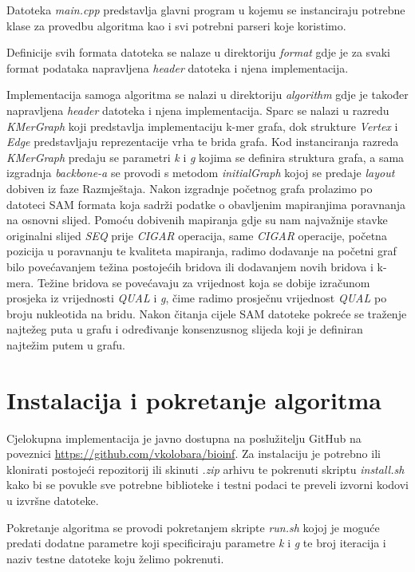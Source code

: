 \documentclass[times, utf8, seminar, numeric]{fer}
\begin{document}
Datoteka \emph{main.cpp} predstavlja glavni program u kojemu se instanciraju potrebne klase za provedbu algoritma kao i svi potrebni parseri koje koristimo.

Definicije svih formata datoteka se nalaze u direktoriju \emph{format} gdje je za svaki format podataka napravljena \emph{header} datoteka i njena implementacija.

Implementacija samoga algoritma se nalazi u direktoriju \emph{algorithm} gdje je također napravljena \emph{header} datoteka i njena implementacija. Sparc se nalazi u razredu \emph{KMerGraph} koji predstavlja implementaciju k-mer grafa, dok strukture \emph{Vertex} i \emph{Edge} predstavljaju reprezentacije vrha te brida grafa. Kod instanciranja razreda \emph{KMerGraph} predaju se parametri \emph{k} i \emph{g} kojima se definira struktura grafa, a sama izgradnja \emph{backbone-a} se provodi s metodom \emph{initialGraph} kojoj se predaje \emph{layout} dobiven iz faze Razmještaja. Nakon izgradnje početnog grafa prolazimo po datoteci SAM formata koja sadrži podatke o obavljenim mapiranjima poravnanja na osnovni slijed. Pomoću dobivenih mapiranja gdje su nam najvažnije stavke originalni slijed \emph{SEQ} prije \emph{CIGAR} operacija, same \emph{CIGAR} operacije, početna pozicija u poravnanju te kvaliteta mapiranja, radimo dodavanje na početni graf bilo povećavanjem težina postojećih bridova ili dodavanjem novih bridova i k-mera. Težine bridova se povećavaju za vrijednost koja se dobije izračunom prosjeka iz vrijednosti \emph{QUAL} i \emph{g}, čime radimo prosječnu vrijednost \emph{QUAL} po broju nukleotida na bridu. Nakon čitanja cijele SAM datoteke pokreće se traženje najtežeg puta u grafu i određivanje konsenzusnog slijeda koji je definiran najtežim putem u grafu.

\section{Instalacija i pokretanje algoritma}
Cjelokupna implementacija je javno dostupna na poslužitelju GitHub na poveznici \url{https://github.com/vkolobara/bioinf}. Za instalaciju je potrebno ili klonirati postojeći repozitorij ili skinuti \emph{.zip} arhivu te pokrenuti skriptu \emph{install.sh} kako bi se povukle sve potrebne biblioteke i testni podaci te preveli izvorni kodovi u izvršne datoteke. 

Pokretanje algoritma se provodi pokretanjem skripte \emph{run.sh} kojoj je moguće predati dodatne parametre koji specificiraju parametre \emph{k} i \emph{g} te broj iteracija i naziv testne datoteke koju želimo pokrenuti.
\end{document}
